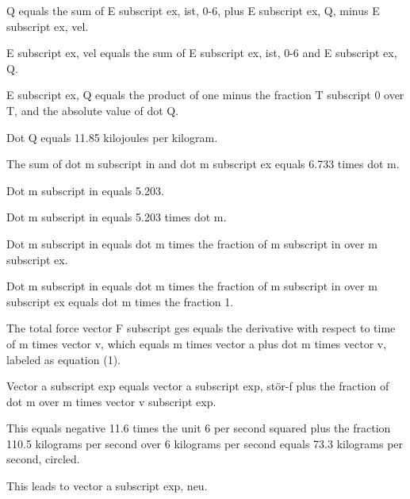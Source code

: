 Q equals the sum of E subscript ex, ist, 0-6, plus E subscript ex, Q, minus E subscript ex, vel.

E subscript ex, vel equals the sum of E subscript ex, ist, 0-6 and E subscript ex, Q.

E subscript ex, Q equals the product of one minus the fraction T subscript 0 over T, and the absolute value of dot Q.

Dot Q equals 11.85 kilojoules per kilogram.

The sum of dot m subscript in and dot m subscript ex equals 6.733 times dot m.

Dot m subscript in equals 5.203.

Dot m subscript in equals 5.203 times dot m.

Dot m subscript in equals dot m times the fraction of m subscript in over m subscript ex.

Dot m subscript in equals dot m times the fraction of m subscript in over m subscript ex equals dot m times the fraction 1.

The total force vector F subscript ges equals the derivative with respect to time of m times vector v, which equals m times vector a plus dot m times vector v, labeled as equation (1).

Vector a subscript exp equals vector a subscript exp, stör-f plus the fraction of dot m over m times vector v subscript exp.

This equals negative 11.6 times the unit 6 per second squared plus the fraction 110.5 kilograms per second over 6 kilograms per second equals 73.3 kilograms per second, circled.

This leads to vector a subscript exp, neu.